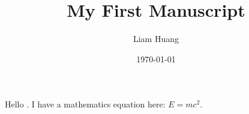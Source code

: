 \documentclass[a4paper, 12pt]{article}
\title{My First Manuscript}
\author{Liam Huang}
\date{\today}
\begin{document}
\maketitle

Hello \LaTex{}. I have a mathematics equation here: $E = mc^2$.
\end{document}
